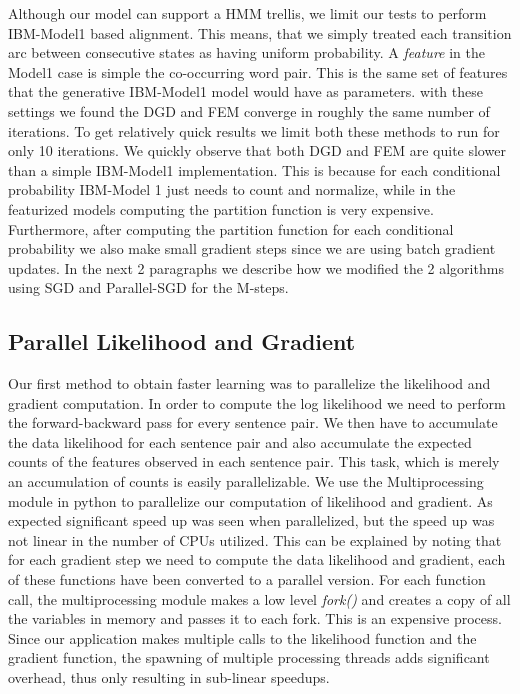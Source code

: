 \documentclass[11pt,letterpaper]{article}
\begin{document}
Although our model can support a HMM trellis, we limit our tests to perform IBM-Model1 based alignment. This means, that we simply treated each transition arc between consecutive states as having uniform probability. A \textit{feature} in the Model1 case is simple the co-occurring word pair. This is the same set of features that the generative IBM-Model1 model would have as parameters. with these settings we found the DGD and FEM converge in roughly the same number of iterations. To get relatively quick results we limit both these methods to run for only 10 iterations. We quickly observe that both DGD and FEM are quite slower than a simple IBM-Model1 implementation. This is because for each conditional probability IBM-Model 1 just needs to count and normalize, while in the featurized models computing the partition function is very expensive. Furthermore, after computing the partition function for each conditional probability we also make small gradient steps since we are using batch gradient updates. In the next 2 paragraphs we describe how we modified the 2 algorithms using SGD and Parallel-SGD for the M-steps.

\subsection*{Parallel Likelihood and Gradient}
Our first method to obtain faster learning was to parallelize the likelihood and gradient computation. In order to compute the log likelihood we need to perform the forward-backward pass for every sentence pair. We then have to accumulate the data likelihood for each sentence pair and also accumulate the expected counts of the features observed in each sentence pair. This task, which is merely an accumulation of counts is easily parallelizable. We use the Multiprocessing module in python to parallelize our computation of likelihood and gradient. As expected significant speed up was seen when parallelized, but the speed up was not linear in the number of CPUs utilized. This can be explained by noting that for each gradient step we need to compute the data likelihood and gradient, each of these functions have been converted to a parallel version. For each function call, the multiprocessing module makes a low level \textit{fork()} and creates a copy of all the variables in memory and passes it to each fork. This is an expensive process. Since our application makes multiple calls to the likelihood function and the gradient function, the spawning of multiple processing threads adds significant overhead, thus only resulting in sub-linear speedups.
\end{document}
